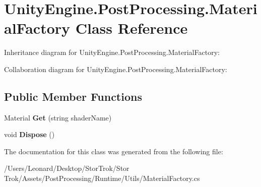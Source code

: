 \hypertarget{class_unity_engine_1_1_post_processing_1_1_material_factory}{}\section{Unity\+Engine.\+Post\+Processing.\+Material\+Factory Class Reference}
\label{class_unity_engine_1_1_post_processing_1_1_material_factory}


Inheritance diagram for Unity\+Engine.\+Post\+Processing.\+Material\+Factory\+:


Collaboration diagram for Unity\+Engine.\+Post\+Processing.\+Material\+Factory\+:
\subsection*{Public Member Functions}
\begin{DoxyCompactItemize}
\item 
\mbox{\label{class_unity_engine_1_1_post_processing_1_1_material_factory_a0805118c985df795d8b2941f30e3845d}} 
Material {\bfseries Get} (string shader\+Name)
\item 
\mbox{\label{class_unity_engine_1_1_post_processing_1_1_material_factory_a5fe3244955fe950b377611e57b2f10ae}} 
void {\bfseries Dispose} ()
\end{DoxyCompactItemize}


The documentation for this class was generated from the following file\+:\begin{DoxyCompactItemize}
\item 
/\+Users/\+Leonard/\+Desktop/\+Stor\+Trok/\+Stor Trok/\+Assets/\+Post\+Processing/\+Runtime/\+Utils/Material\+Factory.\+cs\end{DoxyCompactItemize}
